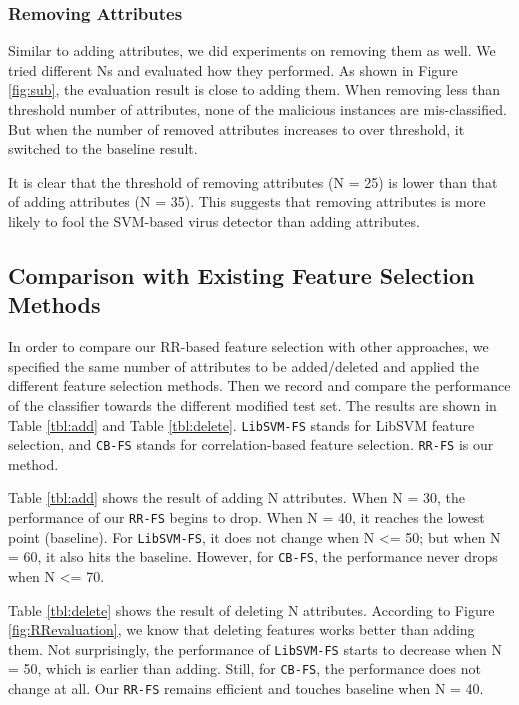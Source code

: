 \documentclass[11pt]{article}
\begin{document}
\subsubsection{Removing Attributes}
Similar to adding attributes, we did experiments on removing them as well. We tried different Ns and evaluated how they performed. As shown in Figure \ref{fig:sub}, the evaluation result is close to adding them. When removing less than threshold number of attributes, none of the malicious instances are mis-classified. But when the number of removed attributes increases to over threshold, it switched to the baseline result. 

It is clear that the threshold of removing attributes (N = 25) is lower than that of adding attributes (N = 35). This suggests that removing attributes is more likely to fool the SVM-based virus detector than adding attributes.

\subsection{Comparison with Existing Feature Selection Methods}
In order to compare our RR-based feature selection with other approaches, we specified the same number of attributes to be added/deleted and applied the different feature selection methods. Then we record and compare the performance of the classifier towards the different modified test set. The results are shown in Table \ref{tbl:add} and Table \ref{tbl:delete}. \texttt{LibSVM-FS} stands for LibSVM feature selection, and \texttt{CB-FS} stands for correlation-based feature selection. \texttt{RR-FS} is our method.

Table \ref{tbl:add} shows the result of adding N attributes. When N = 30, the performance of our \texttt{RR-FS} begins to drop. When N = 40, it reaches the lowest point (baseline). For \texttt{LibSVM-FS}, it does not change when N <= 50; but when N = 60, it also hits the baseline. However, for \texttt{CB-FS}, the performance never drops when N <= 70.


Table \ref{tbl:delete} shows the result of deleting N attributes. According to Figure \ref{fig:RRevaluation}, we know that deleting features works better than adding them. Not surprisingly,  the performance of \texttt{LibSVM-FS} starts to decrease when N = 50, which is earlier than adding. Still, for \texttt{CB-FS}, the performance does not change at all. Our \texttt{RR-FS} remains efficient and touches baseline when N = 40.
\end{document}
